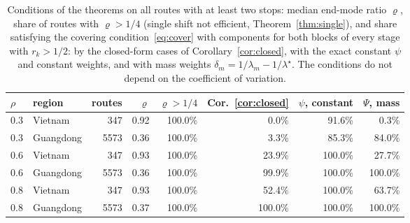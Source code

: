\begin{table}[t]
\centering\small
\caption{Conditions of the theorems on all routes with at least two stops: median
end-mode ratio $\varrho$, share of routes with $\varrho>1/4$ (single shift not
efficient, Theorem~\ref{thm:single}), and share satisfying the covering
condition~\eqref{eq:cover} with components for both blocks of every stage with
$r_k>1/2$: by the closed-form cases of Corollary~\ref{cor:closed}, with the exact
constant $\psi$ and constant weights, and with mass weights
$\delta_m=1/\lambda_m-1/\lambda^\star$. The conditions do not depend on the coefficient
of variation.}
\label{tab:conditions}
\begin{tabular}{llrrrrrr}
\toprule
$\rho$ & region & routes & $\varrho$ & $\varrho>1/4$ & Cor.~\ref{cor:closed} & $\psi$, constant & $\Psi$, mass \\
\midrule
0.3 & Vietnam & 347 & 0.92 & 100.0\% & 0.0\% & 91.6\% & 0.3\% \\
0.3 & Guangdong & 5573 & 0.36 & 100.0\% & 3.3\% & 85.3\% & 84.0\% \\
0.6 & Vietnam & 347 & 0.93 & 100.0\% & 23.9\% & 100.0\% & 27.7\% \\
0.6 & Guangdong & 5573 & 0.36 & 100.0\% & 99.9\% & 100.0\% & 100.0\% \\
0.8 & Vietnam & 347 & 0.93 & 100.0\% & 52.4\% & 100.0\% & 63.7\% \\
0.8 & Guangdong & 5573 & 0.37 & 100.0\% & 100.0\% & 100.0\% & 100.0\% \\
\bottomrule
\end{tabular}
\end{table}
